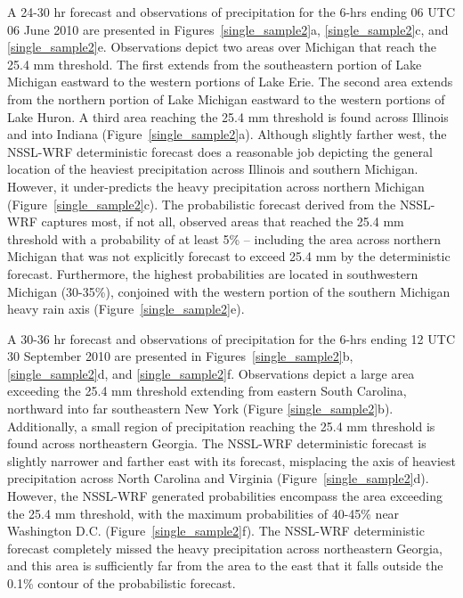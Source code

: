 A 24-30 hr forecast and observations of precipitation for the 6-hrs ending 06 UTC 06 June 2010 are presented in \mbox{Figures \ref{single_sample2}a}, \mbox{\ref{single_sample2}c}, and \mbox{\ref{single_sample2}e}. Observations depict two areas over Michigan that reach the 25.4 mm threshold. The first extends from the southeastern portion of Lake Michigan eastward to the western portions of Lake Erie. The second area extends from the northern portion of Lake Michigan eastward to the western portions of Lake Huron. A third area reaching the 25.4 mm threshold is found across Illinois and into Indiana \mbox{(Figure \ref{single_sample2}a)}. Although slightly farther west, the NSSL-WRF deterministic forecast does a reasonable job depicting the general location of the heaviest precipitation across Illinois and southern Michigan. However, it under-predicts the heavy precipitation across northern Michigan \mbox{(Figure \ref{single_sample2}c)}. The probabilistic forecast derived from the NSSL-WRF captures most, if not all, observed areas that reached the 25.4 mm threshold with a probability of at least 5\% -- including the area across northern Michigan that was not explicitly forecast to exceed 25.4 mm by the deterministic forecast. Furthermore, the highest probabilities are located in southwestern Michigan (30-35\%), conjoined with the western portion of the southern Michigan heavy rain axis \mbox{(Figure \ref{single_sample2}e)}.

A 30-36 hr forecast and observations of precipitation for the 6-hrs ending 12 UTC 30 September 2010 are presented in \mbox{Figures \ref{single_sample2}b}, \mbox{\ref{single_sample2}d}, and \mbox{\ref{single_sample2}f}. Observations depict a large area exceeding the 25.4 mm threshold extending from eastern South Carolina, northward into far southeastern New York (Figure \mbox{\ref{single_sample2}b)}. Additionally, a small region of precipitation reaching the 25.4 mm threshold is found across northeastern Georgia. The NSSL-WRF deterministic forecast is slightly narrower and farther east with its forecast, misplacing the axis of heaviest precipitation across North Carolina and Virginia \mbox{(Figure \ref{single_sample2}d)}. However, the NSSL-WRF generated probabilities encompass the area exceeding the 25.4 mm threshold, with the maximum probabilities of 40-45\% near Washington D.C. \mbox{(Figure \ref{single_sample2}f)}. The NSSL-WRF deterministic forecast completely missed the heavy precipitation across northeastern Georgia, and this area is sufficiently far from the area to the east that it falls outside the 0.1\% contour of the probabilistic forecast.

